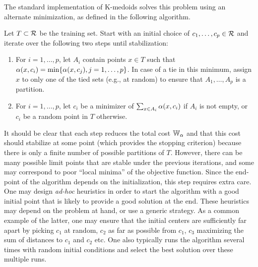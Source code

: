 The standard implementation of K-medoids solves this problem using an alternate minimization, as defined in the following algorithm.
\begin{algorithm}[K-medoids] 
\label{alg:kmed}
Let $T\subset {\mathcal R}$ be the training set.
 Start with an initial choice of $c_1, \ldots, c_p\in {\mathcal R}$ and iterate over the following two steps until stabilization:
\begin{enumerate}[leftmargin=1cm]
\item For $i = 1, \ldots, p$, let $A_i$ contain points $x\in T$ such that $\alpha(x, c_i) = \min\{\alpha(x, c_j), j=1, \ldots, p\}$. In case of a tie in this minimum, assign $x$ to only one of the tied sets (e.g., at random) to ensure that $A_1, \ldots, A_p$ is a partition.
\item For $i=1, \ldots, p$, let $c_i$ be a minimizer of $\sum_{x\in A_i} \alpha(x, c_i)$ if $A_i$ is not empty, or $c_i$ be a random point in $T$ otherwise.
\end{enumerate}
\end{algorithm}

It should be clear that each step reduces the total cost ${\mathbb W}_\alpha$ and that this cost should stabilize at some point (which provides the stopping criterion) because there is only a finite number of possible partitions of $T$. However, there can be many possible limit points that are stable under the previous iterations, and some may correspond to poor ``local minima'' of the objective function. Since the end-point of the algorithm depends on the initialization, this step requires extra care. One may design {\it ad-hoc} heuristics in order to start the algorithm with a good initial point that is likely to provide a good solution at the end. These heuristics may depend on the problem at hand, or use a generic strategy. As a common example of the latter, one may ensure that the initial centers are sufficiently far apart by picking $c_1$ at random, $c_2$ as far as possible from $c_1$, $c_3$ maximizing the sum of distances to $c_1$ and $c_2$ etc. 
One also typically runs the algorithm several times with random initial conditions and select the best solution over these multiple runs. 

